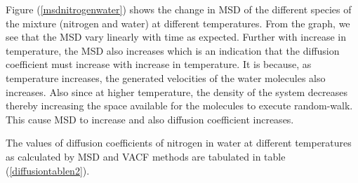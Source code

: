  Figure (\ref{msdnitrogenwater}) shows the change in MSD of  the different species of the mixture (nitrogen and water)  at different temperatures. From the
 graph, we see that the MSD vary linearly with time as expected. Further with increase
 in temperature, the MSD also increases which is an indication that the diffusion coefficient must increase with increase in temperature. It is because, as temperature increases,
 the generated velocities of the water molecules also increases. Also since at higher 
 temperature, the density of the system decreases thereby increasing the space available for
 the molecules to execute random-walk. This cause MSD to increase and also diffusion
 coefficient increases.
  
 The values of diffusion coefficients of nitrogen in water at different temperatures as calculated
 by MSD and VACF methods  are tabulated in table (\ref{diffusiontablen2}).
 
 \begin{table}[H]
    \centering
    \caption[The simulated value and the experimental value of Self-Diffusion coefficient of N2
    molecule. ]{The simulated value and the experimental value of Self-Diffusion coefficient of N2  molecule as a  function of temperature are listed.}
   \label{diffusiontablen2}
  \end{table} 
  
